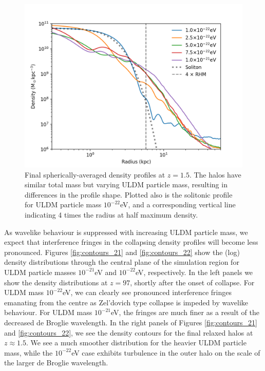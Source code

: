 \documentclass[a4paper,11pt]{article}
\begin{document}
\begin{figure}[!htb]
    \centering
  \includegraphics[trim={0cm 0cm 0cm .5cm},scale=0.7]{profile_comp_with_sol.png}
  \caption{Final spherically-averaged density profiles at $z = 1.5$. The halos have similar total mass but varying ULDM particle mass, resulting in differences in the profile shape. Plotted also is the solitonic profile for ULDM particle mass $10^{-22}$eV, and a corresponding vertical line indicating 4 times the radius at half maximum density.}\label{fig:profile_comp_with_sol}
\end{figure}

As wavelike behaviour is suppressed with increasing ULDM particle mass, we expect that interference fringes in the collapsing density profiles will become less pronounced. Figures \ref{fig:contours_21} and \ref{fig:contours_22} show the (log) density distributions through the central plane of the simulation region for ULDM particle masses $10^{-21}$eV and $10^{-22}$eV, respectively. In the left panels we show the density distributions at $z=97$, shortly after the onset of collapse. For ULDM mass $10^{-22}$eV, we can clearly see pronounced interference fringes emanating from the centre as Zel'dovich type collapse is impeded by wavelike behaviour. For ULDM mass $10^{-21}$eV, the fringes are much finer as a result of the decreased de Broglie wavelength. In the right panels of Figures \ref{fig:contours_21} and \ref{fig:contours_22}, we see the density contours for the final relaxed halos at $z\approx 1.5$. We see a much smoother distribution for the heavier ULDM particle mass, while the $10^{-22}$eV case exhibits turbulence in the outer halo on the scale of the larger de Broglie wavelength. 
\end{document}
